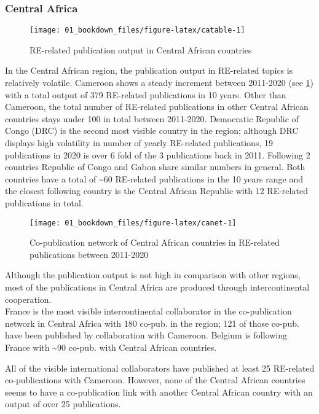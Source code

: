\documentclass[12pt,twoside]{report}
\begin{document}
\hypertarget{central-africa}{%
\subsubsection{Central Africa}\label{central-africa}}

\begin{figure}
\texttt{[image: 01\_bookdown\_files/figure-latex/catable-1]} \caption{RE-related publication output in Central African countries}\label{fig:catable}
\end{figure}

In the Central African region, the publication output in RE-related topics is relatively volatile. Cameroon shows a steady increment between 2011-2020 (see \ref{fig:catable}) with a total output of 379 RE-related publications in 10 years. Other than Cameroon, the total number of RE-related publications in other Central African countries stays under 100 in total between 2011-2020. Democratic Republic of Congo (DRC) is the second most visible country in the region; although DRC displays high volatility in number of yearly RE-related publications, 19 publications in 2020 is over 6 fold of the 3 publications back in 2011. Following 2 countries Republic of Congo and Gabon share similar numbers in general. Both countries have a total of \textasciitilde60 RE-related publications in the 10 years range and the closest following country is the Central African Republic with 12 RE-related publications in total.

\begin{figure}
\texttt{[image: 01\_bookdown\_files/figure-latex/canet-1]} \caption{Co-publication network of Central African countries in RE-related publications between 2011-2020}\label{fig:canet}
\end{figure}

Although the publication output is not high in comparison with other regions, most of the publications in Central Africa are produced through intercontinental cooperation.\\
France is the most visible intercontinental collaborator in the co-publication network in Central Africa with 180 co-pub. in the region; 121 of those co-pub. have been published by collaboration with Cameroon. Belgium is following France with \textasciitilde90 co-pub. with Central African countries.

All of the visible international collaborators have published at least 25 RE-related co-publications with Cameroon. However, none of the Central African countries seems to have a co-publication link with another Central African country with an output of over 25 publications.
\end{document}
